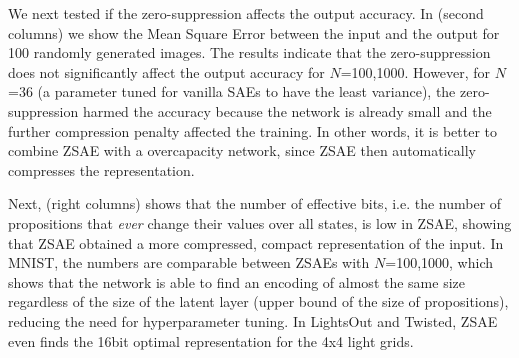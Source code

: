 We next tested if the zero-suppression affects the output accuracy.
In  (second columns)
we show the Mean Square Error between the input and the output
for 100 randomly generated images.
The results indicate that the zero-suppression does not significantly affect the output accuracy for $N$=100,1000.
However, for $N$=36 (a parameter tuned for vanilla SAEs to have the least variance), the zero-suppression
harmed the accuracy because the network is already small and the further compression penalty affected the training.
In other words, it is better to combine ZSAE with a overcapacity network,
since ZSAE then automatically compresses the representation.

Next,  (right columns) shows that the number of effective bits,
i.e. the number of propositions that \emph{ever} change their values over all states, is low in ZSAE, showing that
ZSAE obtained a more compressed, compact representation of the input.
In MNIST, the numbers are comparable between ZSAEs with $N$=100,1000,
which shows that the network is able to find an encoding of almost the same size
regardless of the size of the latent layer (upper bound of the size of
propositions), reducing the need for hyperparameter tuning.
In LightsOut and Twisted, ZSAE even finds the 16bit optimal representation for the 4x4 light grids.


